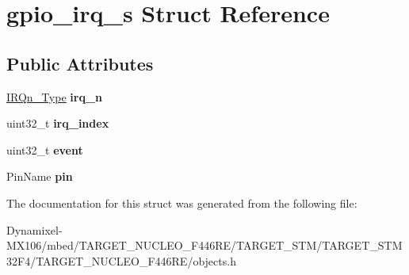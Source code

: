 \hypertarget{structgpio__irq__s}{}\section{gpio\+\_\+irq\+\_\+s Struct Reference}
\label{structgpio__irq__s}
\subsection*{Public Attributes}
\begin{DoxyCompactItemize}
\item 
\hyperlink{group___peripheral__interrupt__number__definition_ga7e1129cd8a196f4284d41db3e82ad5c8}{I\+R\+Qn\+\_\+\+Type} {\bfseries irq\+\_\+n}\hypertarget{structgpio__irq__s_a674f50cb6eb01ee0cf16e9b435717424}{}\label{structgpio__irq__s_a674f50cb6eb01ee0cf16e9b435717424}

\item 
uint32\+\_\+t {\bfseries irq\+\_\+index}\hypertarget{structgpio__irq__s_ab0cc95f80ffa307619e73eb87685513d}{}\label{structgpio__irq__s_ab0cc95f80ffa307619e73eb87685513d}

\item 
uint32\+\_\+t {\bfseries event}\hypertarget{structgpio__irq__s_a67be5371dd952c5081c4fc93cea716e8}{}\label{structgpio__irq__s_a67be5371dd952c5081c4fc93cea716e8}

\item 
Pin\+Name {\bfseries pin}\hypertarget{structgpio__irq__s_ace0f3fd546dbfa8c7f44748dcbada006}{}\label{structgpio__irq__s_ace0f3fd546dbfa8c7f44748dcbada006}

\end{DoxyCompactItemize}


The documentation for this struct was generated from the following file\+:\begin{DoxyCompactItemize}
\item 
Dynamixel-\/\+M\+X106/mbed/\+T\+A\+R\+G\+E\+T\+\_\+\+N\+U\+C\+L\+E\+O\+\_\+\+F446\+R\+E/\+T\+A\+R\+G\+E\+T\+\_\+\+S\+T\+M/\+T\+A\+R\+G\+E\+T\+\_\+\+S\+T\+M32\+F4/\+T\+A\+R\+G\+E\+T\+\_\+\+N\+U\+C\+L\+E\+O\+\_\+\+F446\+R\+E/objects.\+h\end{DoxyCompactItemize}
